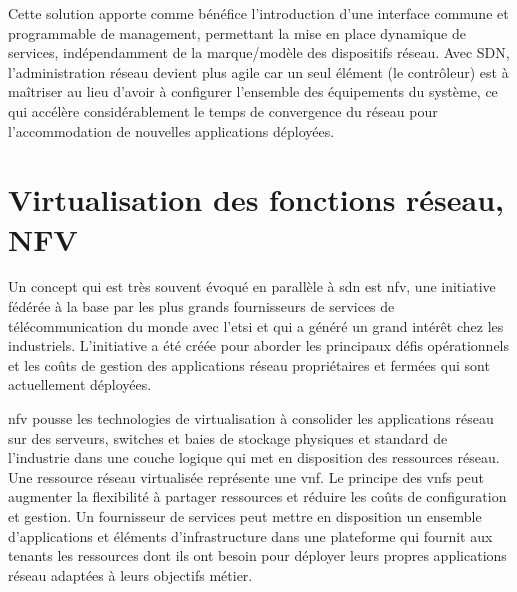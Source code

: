 
Cette solution apporte comme bénéfice l'introduction d'une interface commune et programmable de management, permettant la mise en place dynamique de services, indépendamment de la marque/modèle des dispositifs réseau. Avec SDN, l'administration réseau devient plus agile car un seul élément (le contrôleur) est à maîtriser au lieu d'avoir à configurer l'ensemble des équipements du système, ce qui accélère considérablement le temps de convergence du réseau pour l'accommodation de nouvelles applications déployées. \cite{SDNNewNormONFExecutiveSummary} \cite{ImplementationChallengesForSDNBackground}





\section{Virtualisation des fonctions réseau, NFV}


Un concept qui est très souvent évoqué en parallèle à \gls{sdn} est \gls{nfv}, une initiative fédérée à la base par les plus grands fournisseurs de services  de télécommunication du monde avec l'\gls{etsi} et qui a généré un grand intérêt chez les industriels. L'initiative a été créée pour aborder les principaux défis opérationnels et les coûts de gestion des applications réseau propriétaires et fermées qui sont actuellement déployées.


\gls{nfv} pousse les technologies de virtualisation à consolider les applications réseau sur des serveurs, switches et baies de stockage physiques et standard de l'industrie dans une couche logique qui met en disposition des ressources réseau. Une ressource réseau virtualisée représente une \gls{vnf}. Le principe des \glspl{vnf} peut augmenter la flexibilité à partager ressources et réduire les coûts de configuration et gestion. Un fournisseur de services peut mettre en disposition un ensemble d'applications et éléments d'infrastructure dans une plateforme qui fournit aux tenants les ressources dont ils ont besoin pour déployer leurs propres applications réseau adaptées à leurs objectifs métier.



